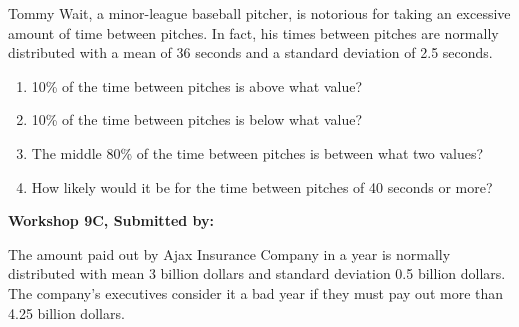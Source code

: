 \documentclass[11pt]{book}\usepackage[]{graphicx}\usepackage[]{color}
\begin{document}
\begin{exercises}
\begin{exercise}
Tommy Wait, a minor-league baseball pitcher, is notorious for taking an excessive \\ amount of time between pitches. In fact, his times between pitches are normally distributed with a mean of 36 seconds and a standard deviation of 2.5 seconds.

\begin{enumerate}
  \item 10\% of the time between pitches is above what value?
  \item 10\% of the time between pitches is below what value?
  \item The middle 80\% of the time between pitches is between what two values?
  \item How likely would it be for the time between pitches of 40 seconds or more? \end{enumerate}

\end{exercise}
\begin{solution}  %

\end{solution}

\clearpage

    \begin{exercise}  %

    \begin{center}
\begin{flushleft}\textbf{\large \hfill Workshop 9C, Submitted by: }\end{flushleft}

\end{center}

The amount paid out by Ajax Insurance Company in a year is normally distributed with mean 3 billion dollars and standard deviation 0.5 billion dollars. The company’s executives consider it a bad year if they must pay out more than 4.25 billion dollars.


\end{exercise}
\end{exercises}
\end{document}
